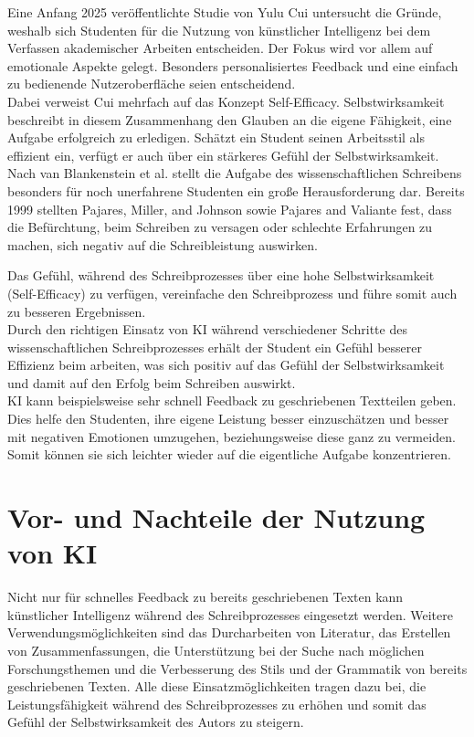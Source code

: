 \documentclass[../main.tex]{subfiles}
\begin{document}
Eine Anfang 2025 veröffentlichte Studie von Yulu Cui untersucht die Gründe, weshalb sich Studenten für die Nutzung von 
künstlicher Intelligenz bei dem Verfassen akademischer Arbeiten entscheiden. Der Fokus wird vor allem auf emotionale 
Aspekte gelegt. Besonders personalisiertes Feedback und eine einfach zu bedienende Nutzeroberfläche seien entscheidend.\cite{SelfEfficacyBeliefs} \\
Dabei verweist Cui mehrfach auf das Konzept Self-Efficacy. Selbstwirksamkeit beschreibt in diesem Zusammenhang den Glauben 
an die eigene Fähigkeit, eine Aufgabe erfolgreich zu erledigen. Schätzt ein Student seinen Arbeitsstil als effizient ein, 
verfügt er auch über ein stärkeres Gefühl der Selbstwirksamkeit.\\
Nach van Blankenstein et al. stellt die Aufgabe des wissenschaftlichen Schreibens besonders für noch unerfahrene Studenten 
ein große Herausforderung dar. Bereits 1999 stellten Pajares, Miller, and Johnson sowie Pajares and Valiante fest,
dass die Befürchtung, beim Schreiben zu versagen oder schlechte Erfahrungen zu machen, sich negativ auf die Schreibleistung 
auswirken.\cite{writingSelfBeliefs,writingSelfBeliefsMiddleSchool}

Das Gefühl, während des Schreibprozesses über eine hohe Selbstwirksamkeit (Self-Efficacy) zu verfügen, vereinfache den 
Schreibprozess und führe somit auch zu besseren Ergebnissen.\cite{SelfEfficacyBeliefs} \\
Durch den richtigen Einsatz von KI während verschiedener Schritte des wissenschaftlichen Schreibprozesses erhält der Student
ein Gefühl besserer Effizienz beim arbeiten, was sich positiv auf das Gefühl der Selbstwirksamkeit und damit auf den Erfolg
beim Schreiben auswirkt.\\
KI kann beispielsweise sehr schnell Feedback zu geschriebenen Textteilen geben. Dies helfe den Studenten, ihre eigene 
Leistung besser einzuschätzen und besser mit negativen Emotionen umzugehen, beziehungsweise diese ganz zu vermeiden. Somit 
können sie sich leichter wieder auf die eigentliche Aufgabe konzentrieren.\cite{SelfEfficacyBeliefs} 



\section{Vor- und Nachteile der Nutzung von KI}

Nicht nur für schnelles Feedback zu bereits geschriebenen Texten kann künstlicher Intelligenz während des Schreibprozesses eingesetzt werden. 
Weitere Verwendungsmöglichkeiten sind das Durcharbeiten von Literatur, das Erstellen von Zusammenfassungen, die Unterstützung bei der Suche nach 
möglichen Forschungsthemen und die Verbesserung des Stils und der Grammatik von bereits geschriebenen Texten. Alle diese Einsatzmöglichkeiten 
tragen dazu bei, die Leistungsfähigkeit während des Schreibprozesses zu erhöhen und somit das Gefühl der Selbstwirksamkeit des Autors zu steigern.\cite{SelfEfficacyBeliefs}
\end{document}
